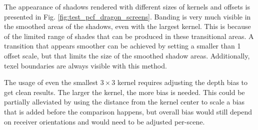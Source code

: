 The appearance of shadows rendered with different sizes of kernels and offsets is presented in Fig. \ref{fig:test_pcf_dragon_screens}.
Banding is very much visible in the smoothed areas of the shadows, even with the largest kernel. This is because of the limited range of shades that can be produced in these transitional areas. A transition that appears smoother can be achieved by setting a smaller than 1 offset scale, but that limits the size of the smoothed shadow areas. Additionally, texel boundaries are always visible with this method.

The usage of even the smallest \(3\times 3\) kernel requires adjusting the depth bias to get clean results. The larger the kernel, the more bias is needed. This could be partially alleviated by using the distance from the kernel center to scale a bias that is added before the comparison happens, but overall bias would still depend on receiver orientations and would need to be adjusted per-scene.

